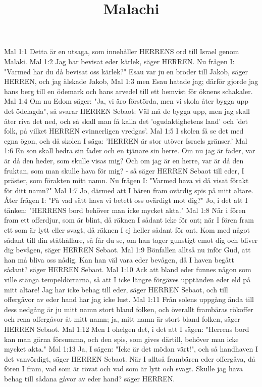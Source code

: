 

\title{Malachi}

Mal 1:1  Detta är en utsaga, som innehåller HERRENS ord till Israel genom Malaki.
Mal 1:2  Jag har bevisat eder kärlek, säger HERREN. Nu frågen I: "Varmed har du då bevisat oss kärlek?" Esau var ju en broder till Jakob, säger HERREN, och jag älskade Jakob,
Mal 1:3  men Esau hatade jag; därför gjorde jag hans berg till en ödemark och hans arvedel till ett hemvist för öknens schakaler.
Mal 1:4  Om nu Edom säger: "Ja, vi äro förstörda, men vi skola åter bygga upp det ödelagda", så svarar HERREN Sebaot: Väl må de bygga upp, men jag skall åter riva det ned, och så skall man få kalla det 'ogudaktighetens land' och 'det folk, på vilket HERREN evinnerligen vredgas'.
Mal 1:5  I skolen få se det med egna ögon, och då skolen I säga: 'HERREN är stor utöver Israels gränser.'
Mal 1:6  En son skall hedra sin fader och en tjänare sin herre. Om nu jag är fader, var är då den heder, som skulle visas mig? Och om jag är en herre, var är då den fruktan, som man skulle hava för mig? - så säger HERREN Sebaot till eder, I präster, som förakten mitt namn. Nu frågen I: "Varmed hava vi då visat förakt för ditt namn?"
Mal 1:7  Jo, därmed att I bären fram ovärdig spis på mitt altare. Åter frågen I: "På vad sätt hava vi betett oss ovärdigt mot dig?" Jo, i det att I tänken: "HERRENS bord behöver man icke mycket akta."
Mal 1:8  När i fören fram ett offerdjur, som är blint, då räknen I sådant icke för ont; när I fören fram ett som är lytt eller svagt, då räknen I ej heller sådant för ont. Kom med något sådant till din ståthållare, så får du se, om han tager gunstigt emot dig och bliver dig bevågen, säger HERREN Sebaot.
Mal 1:9  Bönfallen alltså nu inför Gud, att han må bliva oss nådig. Kan han väl vara eder bevågen, då I haven begått sådant? säger HERREN Sebaot.
Mal 1:10  Ack att bland eder funnes någon som ville stänga tempeldörrarna, så att I icke längre förgäves upptänden eder eld på mitt altare! Jag har icke behag till eder, säger HERREN Sebaot, och till offergåvor av eder hand har jag icke lust.
Mal 1:11  Från solens uppgång ända till dess nedgång är ju mitt namn stort bland folken, och överallt frambäras rökoffer och rena offergåvor åt mitt namn; ja, mitt namn är stort bland folken, säger HERREN Sebaot.
Mal 1:12  Men I ohelgen det, i det att I sägen: "Herrens bord kan man gärna försumma, och den spis, som gives därtill, behöver man icke mycket akta."
Mal 1:13  Ja, I sägen: "Icke är det mödan värt!", och så handhaven I det vanvördigt, säger HERREN Sebaot. När I alltså frambären eder offergåva, då fören I fram, vad som är rövat och vad som är lytt och svagt. Skulle jag hava behag till sådana gåvor av eder hand? säger HERREN.
